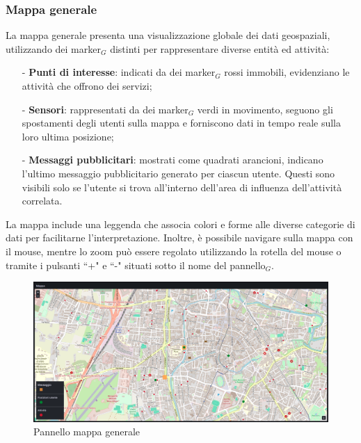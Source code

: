 \documentclass[10pt]{article}
\begin{document}
\begin{justify}
    \subsubsection{Mappa generale}
    La mappa generale presenta una visualizzazione globale dei dati geospaziali, utilizzando dei marker$_G$ distinti per rappresentare diverse entità ed attività:
    \begin{itemize}
        \item[-] \textbf{Punti di interesse}: indicati da dei marker$_G$ rossi immobili, evidenziano le attività che offrono dei servizi;
        \item[-] \textbf{Sensori}: rappresentati da dei marker$_G$ verdi in movimento, seguono gli spostamenti degli utenti sulla mappa e forniscono dati in tempo reale sulla loro ultima posizione;
        \item[-] \textbf{Messaggi pubblicitari}: mostrati come quadrati arancioni, indicano l'ultimo messaggio pubblicitario generato per ciascun utente. Questi sono visibili solo se l'utente si trova all'interno dell'area di influenza dell'attività correlata.
    \end{itemize}
    La mappa include una leggenda che associa colori e forme alle diverse categorie di dati per facilitarne l'interpretazione. Inoltre, è possibile navigare sulla mappa con il mouse, mentre lo zoom può essere regolato utilizzando la rotella del mouse o tramite i pulsanti ``+" e ``-" situati sotto il nome del pannello$_G$.
    \begin{figure}[H]
    \centering
    \includegraphics[width=1\linewidth]{mappa.png}
    \caption{Pannello mappa generale}
    \end{figure}
    

\end{justify}
\end{document}
